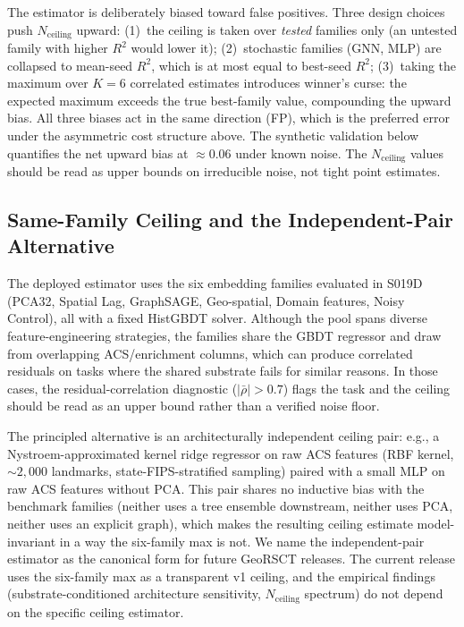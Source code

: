 \documentclass{article}
\begin{document}
The estimator is deliberately biased toward false positives. Three design choices push $N_{\text{ceiling}}$ upward: (1)~the ceiling is taken over \emph{tested} families only (an untested family with higher $R^2$ would lower it); (2)~stochastic families (GNN, MLP) are collapsed to mean-seed $R^2$, which is at most equal to best-seed $R^2$; (3)~taking the maximum over $K{=}6$ correlated estimates introduces winner's curse: the expected maximum exceeds the true best-family value, compounding the upward bias. All three biases act in the same direction (FP), which is the preferred error under the asymmetric cost structure above. The synthetic validation below quantifies the net upward bias at ${\approx}0.06$ under known noise. The $N_{\text{ceiling}}$ values should be read as upper bounds on irreducible noise, not tight point estimates.

\subsection{Same-Family Ceiling and the Independent-Pair Alternative}

The deployed estimator uses the six embedding families evaluated in S019D (PCA32, Spatial Lag, GraphSAGE, Geo-spatial, Domain features, Noisy Control), all with a fixed HistGBDT solver. Although the pool spans diverse feature-engineering strategies, the families share the GBDT regressor and draw from overlapping ACS/enrichment columns, which can produce correlated residuals on tasks where the shared substrate fails for similar reasons. In those cases, the residual-correlation diagnostic ($|\bar\rho| > 0.7$) flags the task and the ceiling should be read as an upper bound rather than a verified noise floor.

The principled alternative is an architecturally independent ceiling pair: e.g., a Nystroem-approximated kernel ridge regressor on raw ACS features (RBF kernel, ${\sim}2{,}000$ landmarks, state-FIPS-stratified sampling) paired with a small MLP on raw ACS features without PCA. This pair shares no inductive bias with the benchmark families (neither uses a tree ensemble downstream, neither uses PCA, neither uses an explicit graph), which makes the resulting ceiling estimate model-invariant in a way the six-family max is not. We name the independent-pair estimator as the canonical form for future GeoRSCT releases. The current release uses the six-family max as a transparent v1 ceiling, and the empirical findings (substrate-conditioned architecture sensitivity, $N_{\text{ceiling}}$ spectrum) do not depend on the specific ceiling estimator.
\end{document}
